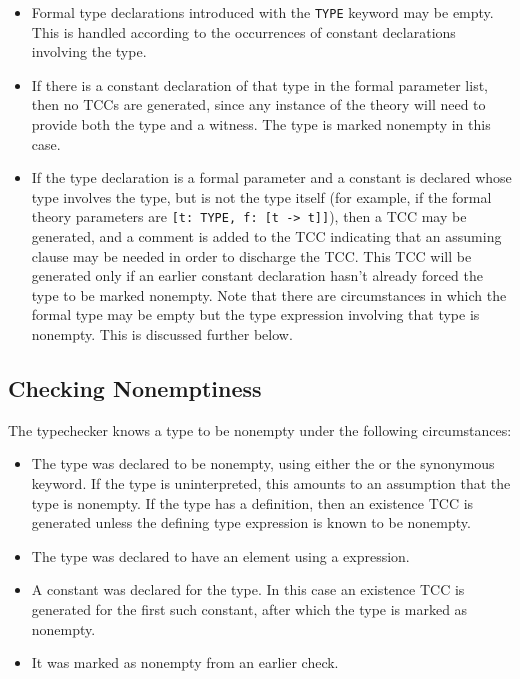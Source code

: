 \begin{itemize}

\item Formal type declarations introduced with the \texttt{TYPE} keyword may
be empty.  This is handled according to the occurrences of constant
declarations involving the type.

\item If there is a constant declaration of that type in the formal
parameter list, then no TCCs are generated, since
any instance of the theory will need to provide both the type and a
witness.  The type is marked nonempty in this case.

\item If the type declaration is a formal parameter and a constant is
declared whose type involves the type, but is not the type itself (for
example, if the formal theory parameters are \texttt{[t:\ TYPE, f:\ [t ->
t]]}), then a TCC may be generated, and a comment is added to the TCC
indicating that an assuming clause may be needed in order to discharge the
TCC.  This TCC will be generated only if an earlier constant declaration
hasn't already forced the type to be marked nonempty.  Note that there are
circumstances in which the formal type may be empty but the type
expression involving that type is nonempty.  This is discussed further
below.

\end{itemize}

\subsection{Checking Nonemptiness}\label{nonemptiness-check}
The typechecker knows a type to be nonempty under the
following circumstances:
\begin{itemize}

\item The type was declared to be nonempty, using either the
 or
the synonymous  keyword.  If the
type is uninterpreted, this amounts to an assumption that the type is
nonempty.  If the type has a definition, then an existence TCC is
generated unless the defining type expression is known to be nonempty.

\item The type was declared to have an element using a
 expression.

\item A constant was declared for the type.  In this case an existence TCC
is generated for the first such constant, after which the type is marked
as nonempty.

\item It was marked as nonempty from an earlier check.

\end{itemize}

